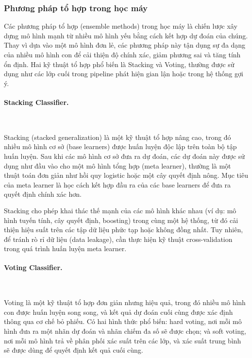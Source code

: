 \vspace{0.5em}

\subsubsection{Phương pháp tổ hợp trong học máy}

Các phương pháp tổ hợp (ensemble methods) trong học máy là chiến lược xây dựng mô hình mạnh từ nhiều mô hình yếu bằng cách kết hợp dự đoán của chúng. Thay vì dựa vào một mô hình đơn lẻ, các phương pháp này tận dụng sự đa dạng của nhiều mô hình con để cải thiện độ chính xác, giảm phương sai và tăng tính ổn định. Hai kỹ thuật tổ hợp phổ biến là Stacking và Voting, thường được sử dụng như các lớp cuối trong pipeline phát hiện gian lận hoặc trong hệ thống gợi ý.

\paragraph{Stacking Classifier.}~

\vspace{0.5em}

Stacking (stacked generalization) là một kỹ thuật tổ hợp nâng cao, trong đó nhiều mô hình cơ sở (base learners) được huấn luyện độc lập trên toàn bộ tập huấn luyện. Sau khi các mô hình cơ sở đưa ra dự đoán, các dự đoán này được sử dụng như đầu vào cho một mô hình tổng hợp (meta learner), thường là một thuật toán đơn giản như hồi quy logistic hoặc một cây quyết định nông. Mục tiêu của meta learner là học cách kết hợp đầu ra của các base learners để đưa ra quyết định chính xác hơn. 

Stacking cho phép khai thác thế mạnh của các mô hình khác nhau (ví dụ: mô hình tuyến tính, cây quyết định, boosting) trong cùng một hệ thống, từ đó cải thiện hiệu suất trên các tập dữ liệu phức tạp hoặc không đồng nhất. Tuy nhiên, để tránh rò rỉ dữ liệu (data leakage), cần thực hiện kỹ thuật cross-validation trong quá trình huấn luyện meta learner.

\paragraph{Voting Classifier.}~

\vspace{0.5em}

Voting là một kỹ thuật tổ hợp đơn giản nhưng hiệu quả, trong đó nhiều mô hình con được huấn luyện song song, và kết quả dự đoán cuối cùng được xác định thông qua cơ chế bỏ phiếu. Có hai hình thức phổ biến: hard voting, nơi mỗi mô hình đưa ra một nhãn dự đoán và nhãn chiếm đa số sẽ được chọn; và soft voting, nơi mỗi mô hình trả về phân phối xác suất trên các lớp, và xác suất trung bình sẽ được dùng để quyết định kết quả cuối cùng.

